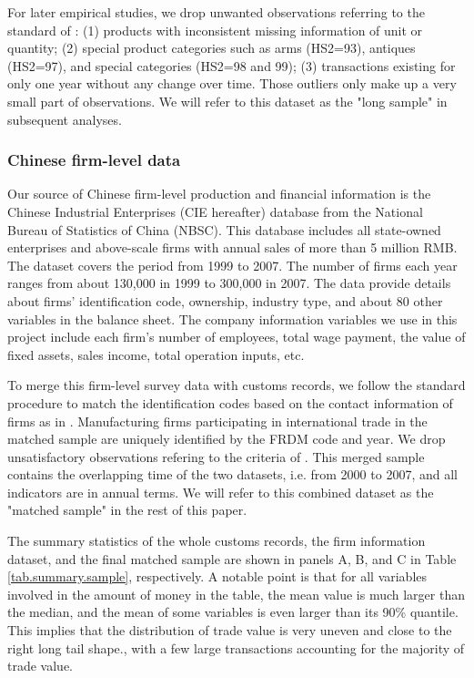 \documentclass[12pt]{article}
\begin{document}
For later empirical studies, we drop unwanted observations referring to the standard of \cite{lmx2015}: (1) products with inconsistent missing information of unit or quantity; (2) special product categories such as arms (HS2=93), antiques (HS2=97), and special categories (HS2=98 and 99); (3) transactions existing for only one year without any change over time. Those outliers only make up a very small part of observations. We will refer to this dataset as the "long sample" in subsequent analyses.

\subsubsection{Chinese firm-level data} \label{Data-CIE}

Our source of Chinese firm-level production and financial information is the Chinese Industrial Enterprises (CIE hereafter) database from the National Bureau of Statistics of China (NBSC). This database includes all state-owned enterprises and above-scale firms with annual sales of more than 5 million RMB. The dataset covers the period from 1999 to 2007. The number of firms each year ranges from about 130,000 in 1999 to 300,000 in 2007. The data provide details about firms’ identification code, ownership, industry type, and about 80 other variables in the balance sheet. The company information variables we use in this project include each firm's number of employees, total wage payment, the value of fixed assets, sales income, total operation inputs, etc.

To merge this firm-level survey data with customs records, we follow the standard procedure to match the identification codes based on the contact information of firms as in \cite{fan-li-yeaple2015}. Manufacturing firms participating in international trade in the matched sample are uniquely identified by the FRDM code and year. We drop unsatisfactory observations refering to the criteria of \cite{bkl2021}. This merged sample contains the overlapping time of the two datasets, i.e. from 2000 to 2007, and all indicators are in annual terms. We will refer to this combined dataset as the "matched sample" in the rest of this paper.

The summary statistics of the whole customs records, the firm information dataset, and the final matched sample are shown in panels A, B, and C in Table \ref{tab.summary.sample}, respectively. A notable point is that for all variables involved in the amount of money in the table, the mean value is much larger than the median, and the mean of some variables is even larger than its 90\% quantile. This implies that the distribution of trade value is very uneven and close to the right long tail shape., with a few large transactions accounting for the majority of trade value.
\end{document}
